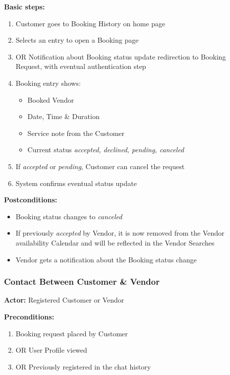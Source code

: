 \documentclass[11pt,a4paper]{article}
\begin{document}
\noindent \textbf{Basic steps:}
\begin{enumerate}
  \item Customer goes to Booking History on home page
  \item Selects an entry to open a Booking page
  \item OR Notification about Booking status update redirection to
    Booking Request, with eventual authentication step
  \item Booking entry shows:
    \begin{itemize}
      \item Booked Vendor
      \item Date, Time \& Duration
      \item Service note from the Customer
      \item Current status \textit{accepted, declined, pending, canceled}
    \end{itemize}
  \item If \textit{accepted} or \textit{pending}, Customer can cancel
    the request
  \item System confirms eventual status update
\end{enumerate}

\noindent \textbf{Postconditions:}
\begin{itemize}
  \item Booking status changes to \textit{canceled}
  \item If previously \textit{accepted} by Vendor, it is now
    removed from the Vendor availability Calendar and will be
    reflected in the Vendor Searches
  \item Vendor gets a notification about the Booking status change
\end{itemize}

\subsubsection{Contact Between Customer \& Vendor}

\textbf{Actor:} Registered Customer or Vendor

\noindent \textbf{Preconditions:}
\begin{enumerate}
  \item Booking request placed by Customer
  \item OR User Profile viewed
  \item OR Previously registered in the chat history
\end{enumerate}
\end{document}
